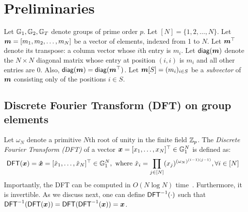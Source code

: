 \section{Preliminaries}

Let $\mathbb{G}_1, \mathbb{G}_2, \mathbb{G}_T$ denote groups of prime order $p$.
Let $[N] = \{1,2,\dots, N\}$.
Let $\bm{m}=[m_1, m_2, \dots, m_N]$ be a vector of elements, indexed from 1 to $N$.
Let $\bm{m}^\top$ denote its transpose: a column vector whose $i$th entry is $m_i$.
Let $\mathsf{diag}(\bm{m})$ denote the $N\times N$ diagonal matrix whose entry at position $(i,i)$ is $m_i$ and all other entries are 0.
Also, $\mathsf{diag}(\bm{m})=\mathsf{diag}(\bm{m}^\top)$.
Let $\bm{m}[S] = (m_i)_{i \in S}$ be a \textit{subvector} of $\bm{m}$ consisting only of the positions $i\in S$.

\subsection{Discrete Fourier Transform (DFT) on group elements}
\label{s:dft}

Let $\omega_N$ denote a primitive $N$th root of unity in the finite field $\mathbb{Z}_p$.
The \textit{Discrete Fourier Transform (DFT)} of a vector $\bm{x} = [x_1,\dots,x_N]^\top \in \mathbb{G}_1^N$ is defined as:
\begin{align}
    \mathsf{DFT}(\bm{x}) &= \bm{\hat{x}} = [\hat{x}_1, \dots, \hat{x}_N]^\top\in \mathbb{G}_1^N,\ \text{where}\ \hat{x}_i= \prod_{j\in [N]} (x_j)^{(\omega_N)^{(i-1)(j-1)}},\forall i\in[N]
\end{align}
Importantly, the DFT can be computed in $O(N\log{N})$ time~\cite{CLRS09}.
Furthermore, it is invertible.
As we discuss next, one can define $\mathsf{DFT}^{-1}(\cdot)$ such that $\mathsf{DFT}^{-1}(\mathsf{DFT}(\bm{x})) = \mathsf{DFT}(\mathsf{DFT}^{-1}(\bm{x})) = \bm{x}$.
%

